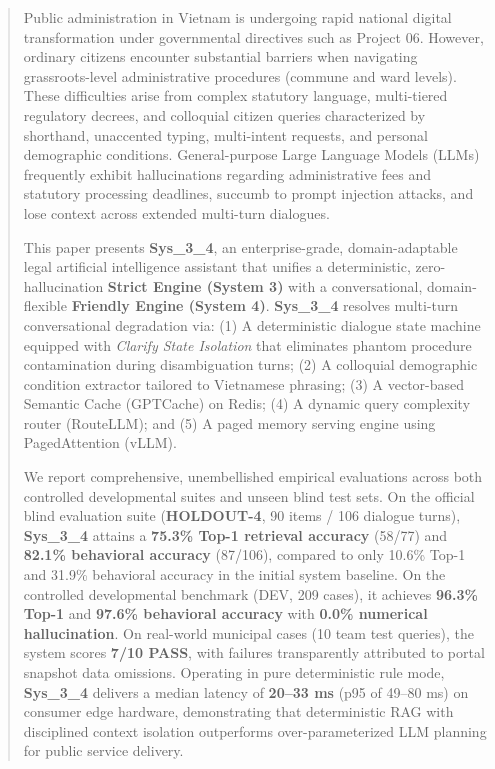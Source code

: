 \documentclass[11pt,a4paper]{article}
\begin{document}
\begin{abstract}
\noindent
Public administration in Vietnam is undergoing rapid national digital transformation under governmental directives such as Project 06. However, ordinary citizens encounter substantial barriers when navigating grassroots-level administrative procedures (commune and ward levels). These difficulties arise from complex statutory language, multi-tiered regulatory decrees, and colloquial citizen queries characterized by shorthand, unaccented typing, multi-intent requests, and personal demographic conditions. General-purpose Large Language Models (LLMs) frequently exhibit hallucinations regarding administrative fees and statutory processing deadlines, succumb to prompt injection attacks, and lose context across extended multi-turn dialogues.

\vspace{1ex}
\noindent
This paper presents \textbf{Sys\_3\_4}, an enterprise-grade, domain-adaptable legal artificial intelligence assistant that unifies a deterministic, zero-hallucination \textbf{Strict Engine (System 3)} with a conversational, domain-flexible \textbf{Friendly Engine (System 4)}. \textbf{Sys\_3\_4} resolves multi-turn conversational degradation via: (1) A deterministic dialogue state machine equipped with \textit{Clarify State Isolation} that eliminates phantom procedure contamination during disambiguation turns; (2) A colloquial demographic condition extractor tailored to Vietnamese phrasing; (3) A vector-based Semantic Cache (GPTCache) on Redis; (4) A dynamic query complexity router (RouteLLM); and (5) A paged memory serving engine using PagedAttention (vLLM).

\vspace{1ex}
\noindent
We report comprehensive, unembellished empirical evaluations across both controlled developmental suites and unseen blind test sets. On the official blind evaluation suite (\textbf{HOLDOUT-4}, 90 items / 106 dialogue turns), \textbf{Sys\_3\_4} attains a \textbf{75.3\% Top-1 retrieval accuracy} (58/77) and \textbf{82.1\% behavioral accuracy} (87/106), compared to only 10.6\% Top-1 and 31.9\% behavioral accuracy in the initial system baseline. On the controlled developmental benchmark (DEV, 209 cases), it achieves \textbf{96.3\% Top-1} and \textbf{97.6\% behavioral accuracy} with \textbf{0.0\% numerical hallucination}. On real-world municipal cases (10 team test queries), the system scores \textbf{7/10 PASS}, with failures transparently attributed to portal snapshot data omissions. Operating in pure deterministic rule mode, \textbf{Sys\_3\_4} delivers a median latency of \textbf{20--33 ms} (p95 of 49--80 ms) on consumer edge hardware, demonstrating that deterministic RAG with disciplined context isolation outperforms over-parameterized LLM planning for public service delivery.
\end{abstract}
\end{document}
